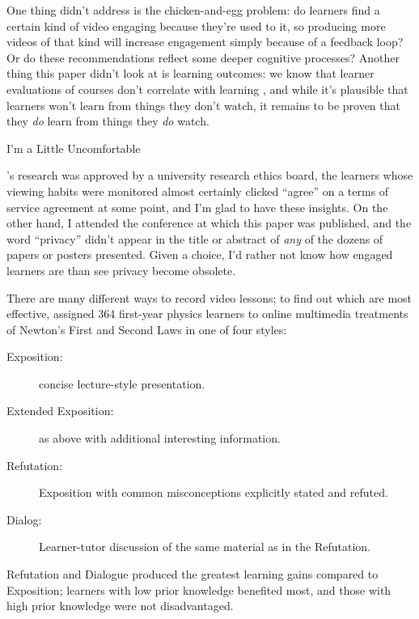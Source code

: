 One thing \cite{Guo2014} didn't address is the chicken-and-egg
problem: do learners find a certain kind of video engaging because
they're used to it, so producing more videos of that kind will
increase engagement simply because of a feedback loop? Or do these
recommendations reflect some deeper cognitive processes? Another thing
this paper didn't look at is learning outcomes: we know that learner
evaluations of courses don't correlate with learning
\cite{Star2014,Uttl2017}, and while it's plausible that
learners won't learn from things they don't watch, it remains to be
proven that they \emph{do} learn from things they \emph{do} watch.

\begin{aside}{I'm a Little Uncomfortable}

\cite{Guo2014}'s research was approved by a university research
ethics board, the learners whose viewing habits were monitored almost
certainly clicked ``agree'' on a terms of service agreement at some
point, and I'm glad to have these insights. On the other hand, I
attended the conference at which this paper was published, and the
word ``privacy'' didn't appear in the title or abstract of \emph{any} of the
dozens of papers or posters presented. Given a choice, I'd rather not
know how engaged learners are than see privacy become obsolete.

\end{aside}

There are many different ways to record video lessons; to find out which
are most effective, \cite{Mull2007a} assigned 364 first-year physics
learners to online multimedia treatments of Newton's First and Second
Laws in one of four styles:

\begin{description}
\item[Exposition:]
concise lecture-style presentation.
\item[Extended Exposition:]
as above with additional interesting information.
\item[Refutation:]
Exposition with common misconceptions explicitly stated and refuted.
\item[Dialog:]
Learner-tutor discussion of the same material as in the Refutation.
\end{description}

Refutation and Dialogue produced the greatest learning gains compared to
Exposition; learners with low prior knowledge benefited most, and those
with high prior knowledge were not disadvantaged.

